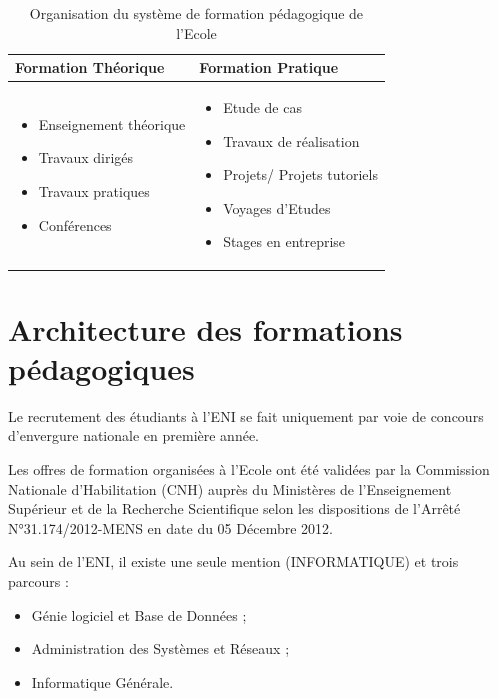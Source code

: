 \documentclass[12pt]{report}
\begin{document}
				\begin{table}[h]
				  \centering
				  \caption{Organisation du système de formation pédagogique de l’Ecole}
				  \label{tab:tableau 1}
					  \begin{tabular}{|p{7cm}|p{7cm}|}
					    \hline
					    Formation Théorique & Formation Pratique \\
					    \hline
					    \begin{itemize}
						\item Enseignement théorique
						\item Travaux dirigés
						\item Travaux pratiques
						\item Conférences
					    \end{itemize}
					 &  
					\begin{itemize}
						\item Etude de cas
						\item Travaux de réalisation
						\item Projets/ Projets tutoriels
						\item Voyages d’Etudes
						\item Stages en entreprise
					\end{itemize}
					\\
					    \hline
					  \end{tabular}
				\end{table}
				\clearpage

				\section{Architecture des formations pédagogiques}

				\hspace{15pt} Le recrutement des étudiants à l’ENI se fait uniquement par voie de concours d’envergure nationale en première année.

				Les offres de formation organisées à l’Ecole ont été validées par la Commission Nationale d’Habilitation (CNH) auprès du Ministères de l’Enseignement Supérieur et de la Recherche Scientifique selon les dispositions de l’Arrêté N°31.174/2012-MENS en date du 05 Décembre 2012.

				\begin{center}
					\begin{minipage}{\textwidth}
						\hspace{15pt} Au sein de l’ENI, il existe une seule mention (INFORMATIQUE) et trois parcours :
						\begin{itemize}
							\item Génie logiciel et Base de Données ;
							\item Administration des Systèmes et Réseaux ; 
							\item Informatique Générale.\\
						\end{itemize}
					\end{minipage}	
				\end{center}
\end{document}
